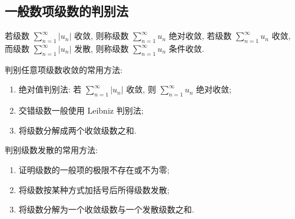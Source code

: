 \subsection{一般数项级数的判别法}

\begin{definition}[绝对收敛与条件收敛]
    若级数 $\displaystyle \sum_{n=1}^{\infty}\left|u_{n}\right| $ 收敛, 则称级数 $\displaystyle \sum_{n=1}^{\infty} u_{n} $ 绝对收敛, 
    若级数 $\displaystyle \sum_{n=1}^{\infty} u_{n} $ 收敛, 而级数 $\displaystyle  \sum_{n=1}^{\infty}\left|u_{n}\right| $ 发散, 则称级数 $\displaystyle \sum_{n=1}^{\infty} u_{n} $ 条件收敛.
\end{definition}

判别任意项级数收敛的常用方法:
\begin{enumerate}[label=(\arabic{*})]
    \item 绝对值判别法: 若 $\displaystyle  \sum_{n=1}^{\infty}\left|u_{n}\right| $ 收敛, 则 $\displaystyle  \sum_{n=1}^{\infty} u_{n} $ 绝对收敛;
    \item 交错级数一般使用 Leibniz 判别法;
    \item 将级数分解成两个收敛级数之和.
\end{enumerate}

判别级数发散的常用方法:
\begin{enumerate}[label=(\arabic{*})]
    \item 证明级数的一般项的极限不存在或不为零;
    \item 将级数按某种方式加括号后所得级数发散;
    \item 将级数分解为一个收敛级数与一个发散级数之和.
\end{enumerate}

